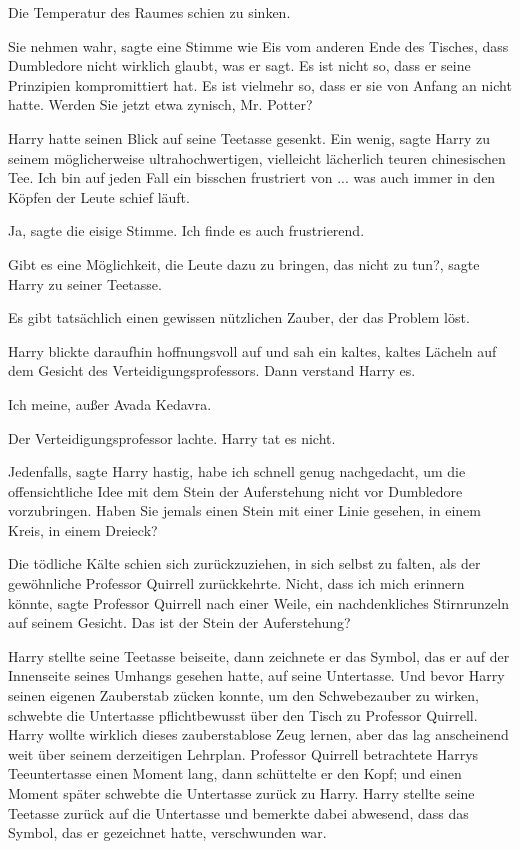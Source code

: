 Die Temperatur des Raumes schien zu sinken.

\glqq{}Sie nehmen wahr\grqq{}, sagte eine Stimme wie Eis vom anderen Ende des
Tisches, \glqq{}dass Dumbledore nicht wirklich glaubt, was er sagt. Es ist nicht
so, dass er seine Prinzipien kompromittiert hat. Es ist vielmehr so, dass er sie
von Anfang an nicht hatte. Werden Sie jetzt etwa zynisch, Mr. Potter?\grqq{}

Harry hatte seinen Blick auf seine Teetasse gesenkt. \glqq{}Ein wenig\grqq{},
sagte Harry zu seinem möglicherweise ultrahochwertigen, vielleicht lächerlich
teuren chinesischen Tee. \glqq{}Ich bin auf jeden Fall ein bisschen frustriert
von ... was auch immer in den Köpfen der Leute schief läuft.\grqq{}

\glqq{}Ja\grqq{}, sagte die eisige Stimme. \glqq{}Ich finde es auch frustrierend.\grqq{}

\glqq{}Gibt es eine Möglichkeit, die Leute dazu zu bringen, das nicht zu
tun?\grqq{}, sagte Harry zu seiner Teetasse.

\glqq{}Es gibt tatsächlich einen gewissen nützlichen Zauber, der das Problem
löst.\grqq{}

Harry blickte daraufhin hoffnungsvoll auf und sah ein kaltes, kaltes Lächeln auf
dem Gesicht des Verteidigungsprofessors. Dann verstand Harry es.

\glqq{}Ich meine, außer Avada Kedavra.\grqq{}

Der Verteidigungsprofessor lachte. Harry tat es nicht.

\glqq{}Jedenfalls\grqq{}, sagte Harry hastig, \glqq{}habe ich schnell genug
nachgedacht, um die offensichtliche Idee mit dem Stein der Auferstehung nicht
vor Dumbledore vorzubringen. Haben Sie jemals einen Stein mit einer Linie
gesehen, in einem Kreis, in einem Dreieck?\grqq{}

Die tödliche Kälte schien sich zurückzuziehen, in sich selbst zu falten, als der
gewöhnliche Professor Quirrell zurückkehrte. \glqq{}Nicht, dass ich mich erinnern
könnte\grqq{}, sagte Professor Quirrell nach einer Weile, ein nachdenkliches
Stirnrunzeln auf seinem Gesicht. \glqq{}Das ist der Stein der Auferstehung?\grqq{}

Harry stellte seine Teetasse beiseite, dann zeichnete er das Symbol, das er auf
der Innenseite seines Umhangs gesehen hatte, auf seine Untertasse. Und bevor
Harry seinen eigenen Zauberstab zücken konnte, um den Schwebezauber zu wirken,
schwebte die Untertasse pflichtbewusst über den Tisch zu Professor Quirrell.
Harry wollte wirklich dieses zauberstablose Zeug lernen, aber das lag
anscheinend weit über seinem derzeitigen Lehrplan. Professor Quirrell
betrachtete Harrys Teeuntertasse einen Moment lang, dann schüttelte er den Kopf;
und einen Moment später schwebte die Untertasse zurück zu Harry. Harry stellte
seine Teetasse zurück auf die Untertasse und bemerkte dabei abwesend, dass das
Symbol, das er gezeichnet hatte, verschwunden war.

